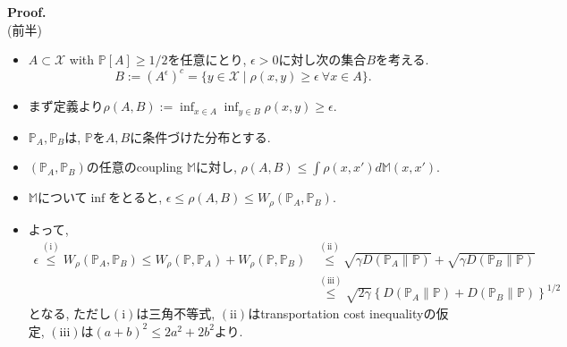 \documentclass[aspectratio=169, dvipdfmx]{beamer}
\newcommand{\bb}{\mathbb}
\newcommand{\cc}{\mathcal}
\begin{document}
\begin{frame}{}{}
{\bf Proof.}\\
{(前半)}
\begin{itemize}
    \item $A \subset \cc{X}$ with $\bb{P}[A]\ge 1/2$を任意にとり,
    $\epsilon >0$に対し次の集合$B$を考える.
    \[
        B := (A^\epsilon)^c = \{ y \in \cc{X} \mid \rho(x,y)\ge \epsilon \ \forall x \in A \}.
    \]
    \item まず定義より$\rho(A, B) := \inf_{x\in A}\inf_{y \in B} \rho(x,y) \ge \epsilon$.
    \item $\bb{P}_A, \bb{P}_B$は, $\bb{P}$を$A, B$に条件づけた分布とする.
    \item $(\bb{P}_A, \bb{P}_B)$の任意のcoupling $\bb{M}$に対し, $\rho(A, B) \le \int \rho(x, x')d\bb{M}(x, x')$.
    \item $\bb{M}$について$\inf$をとると, $\epsilon \le \rho(A, B) \le W_\rho(\bb{P}_A,\bb{P}_B)$.
    \item よって,      
        \begin{align*}
            \epsilon
            \stackrel{\mathrm{(i)}}{\leq} W_{\rho}\left(\mathbb{P}_{A}, \mathbb{P}_{B}\right)
            \leq W_{\rho}\left(\mathbb{P}, \mathbb{P}_{A}\right)+W_{\rho}\left(\mathbb{P}, \mathbb{P}_{B}\right)
            & \stackrel{\mathrm{(ii)}}{\leq}\sqrt{\gamma D\left(\mathbb{P}_{A} \| \mathbb{P}\right)}+\sqrt{\gamma D\left(\mathbb{P}_{B} \| \mathbb{P}\right)} \\
            & \stackrel{\mathrm{(iii)}}{\leq}\sqrt{2 \gamma}\left\{D\left(\mathbb{P}_{A} \| \mathbb{P}\right)+D\left(\mathbb{P}_{B} \| \mathbb{P}\right)\right\}^{1 / 2}
          \end{align*}
          となる,
          ただし$\mathrm{(i)}$は三角不等式,
          $\mathrm{(ii)}$はtransportation cost inequalityの仮定,
          $\mathrm{(iii)}$は$(a+b)^2 \le 2a^2+2b^2$より.
\end{itemize}
\end{frame}
\end{document}
